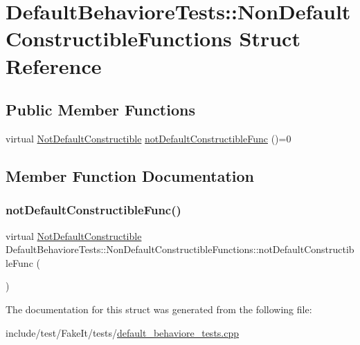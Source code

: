 \hypertarget{structDefaultBehavioreTests_1_1NonDefaultConstructibleFunctions}{}\section{Default\+Behaviore\+Tests\+::Non\+Default\+Constructible\+Functions Struct Reference}
\label{structDefaultBehavioreTests_1_1NonDefaultConstructibleFunctions}
\subsection*{Public Member Functions}
\begin{DoxyCompactItemize}
\item 
virtual \mbox{\hyperlink{structDefaultBehavioreTests_1_1NotDefaultConstructible}{Not\+Default\+Constructible}} \mbox{\hyperlink{structDefaultBehavioreTests_1_1NonDefaultConstructibleFunctions_a523b45d33d134e19d6959b1d8c74062f}{not\+Default\+Constructible\+Func}} ()=0
\end{DoxyCompactItemize}


\subsection{Member Function Documentation}
\mbox{\label{structDefaultBehavioreTests_1_1NonDefaultConstructibleFunctions_a523b45d33d134e19d6959b1d8c74062f}} 
\subsubsection{\texorpdfstring{notDefaultConstructibleFunc()}{notDefaultConstructibleFunc()}}
{\footnotesize\ttfamily virtual \mbox{\hyperlink{structDefaultBehavioreTests_1_1NotDefaultConstructible}{Not\+Default\+Constructible}} Default\+Behaviore\+Tests\+::\+Non\+Default\+Constructible\+Functions\+::not\+Default\+Constructible\+Func (\begin{DoxyParamCaption}{ }\end{DoxyParamCaption})\hspace{0.3cm}{\ttfamily [pure virtual]}}



The documentation for this struct was generated from the following file\+:\begin{DoxyCompactItemize}
\item 
include/test/\+Fake\+It/tests/\mbox{\hyperlink{default__behaviore__tests_8cpp}{default\+\_\+behaviore\+\_\+tests.\+cpp}}\end{DoxyCompactItemize}
